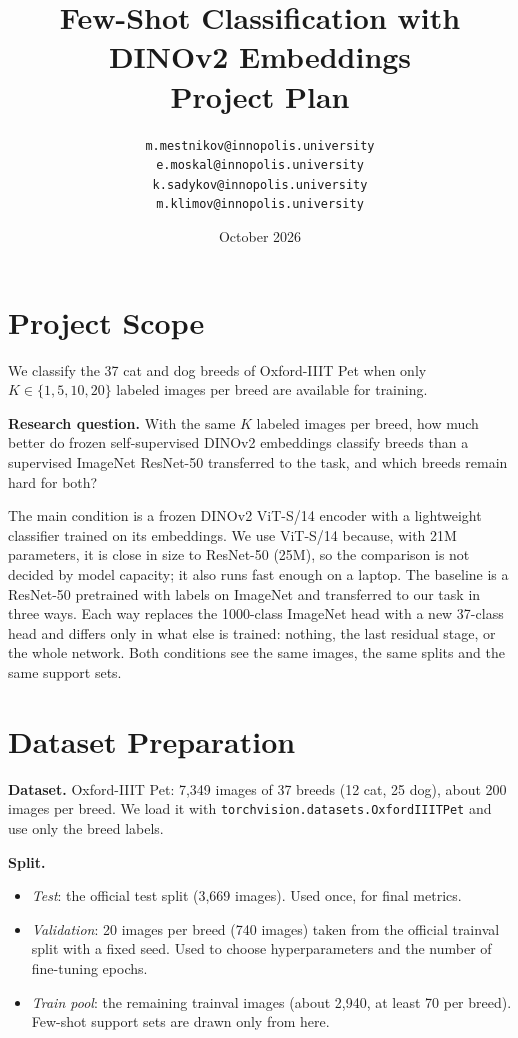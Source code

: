 \documentclass[11pt]{article}
\title{Few-Shot Classification with DINOv2 Embeddings\\
\large Project Plan}
\author{
    \texttt{m.mestnikov@innopolis.university}\\
    \texttt{e.moskal@innopolis.university}\\
    \texttt{k.sadykov@innopolis.university}\\
    \texttt{m.klimov@innopolis.university}
}
\date{October 2026}
\begin{document}
\maketitle

\section{Project Scope}

We classify the 37 cat and dog breeds of Oxford-IIIT Pet when only
$K \in \{1, 5, 10, 20\}$ labeled images per breed are available for training.

\textbf{Research question.} With the same $K$ labeled images per breed, how much
better do frozen self-supervised DINOv2 embeddings classify breeds than a
supervised ImageNet ResNet-50 transferred to the task, and which breeds remain
hard for both?

The main condition is a frozen DINOv2 ViT-S/14 encoder with a lightweight
classifier trained on its embeddings. We use ViT-S/14 because, with 21M parameters,
it is close in size to ResNet-50 (25M), so the comparison is not decided by model
capacity; it also runs fast enough on a laptop. The baseline is a ResNet-50 pretrained with
labels on ImageNet and transferred to our task in three ways. Each way replaces the 1000-class ImageNet head with a new
37-class head and differs only in what else is trained: nothing, the last residual
stage, or the whole network.
Both conditions see the same images, the same splits and the same support sets.

\section{Dataset Preparation}

\textbf{Dataset.} Oxford-IIIT Pet: 7,349 images of 37 breeds (12 cat, 25 dog),
about 200 images per breed. We load it with \texttt{torchvision.datasets.OxfordIIITPet}
and use only the breed labels.

\textbf{Split.}
\begin{itemize}
    \item \emph{Test}: the official test split (3,669 images). Used once, for final metrics.
    \item \emph{Validation}: 20 images per breed (740 images) taken from the
          official trainval split with a fixed seed. Used to choose
          hyperparameters and the number of fine-tuning epochs.
    \item \emph{Train pool}: the remaining trainval images (about 2,940,
          at least 70 per breed). Few-shot support sets are drawn only from here.
\end{itemize}
\end{document}
